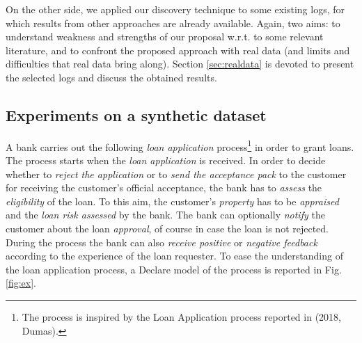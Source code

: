 On the other side, we applied our discovery technique to some existing logs, for which results from other approaches are already available. Again, two aims: to understand weakness and strengths of our proposal w.r.t. to some relevant literature, and to confront the proposed approach with real data (and limits and difficulties that real data bring along). Section \ref{sec:realdata} is devoted to present the selected logs and discuss the obtained results.




\subsection{Experiments on a synthetic dataset}
\label{sec:syntheticlog}



A bank carries out the following \emph{loan application} process\footnote{The process is inspired by the Loan Application process reported in (2018, Dumas).} in order to grant loans. The process starts when the \emph{loan application} is received. In order to decide whether to \emph{reject the application} or to \emph{send the acceptance pack} to the customer for receiving the customer's official acceptance, the bank has to \emph{assess} the \emph{eligibility} of the loan. To this aim, the customer's \emph{property} has to be \emph{appraised} and the \emph{loan risk assessed} by the bank. The bank can optionally \emph{notify} the customer about the loan \emph{approval}, of course in case the loan is not rejected. During the process the bank can also \emph{receive positive} or \emph{negative feedback} according to the experience of the loan requester. To ease the understanding of the loan application process, a Declare model of the process is reported in Fig. \ref{fig:ex}.

